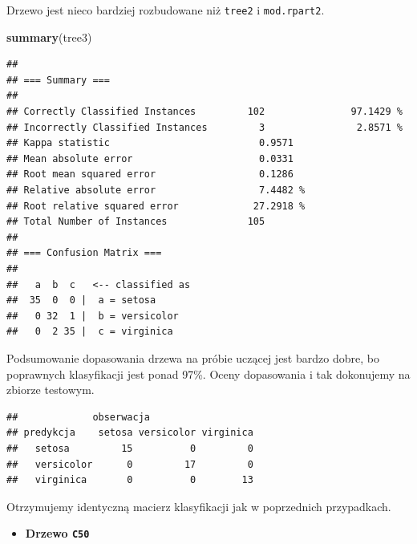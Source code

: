 \documentclass[
]{book}
\newenvironment{Shaded}{\begin{snugshade}}{\end{snugshade}}
\newcommand{\AttributeTok}[1]{\textcolor[rgb]{0.13,0.29,0.53}{#1}}
\newcommand{\FunctionTok}[1]{\textcolor[rgb]{0.13,0.29,0.53}{\textbf{#1}}}
\newcommand{\NormalTok}[1]{#1}
\newcommand{\OtherTok}[1]{\textcolor[rgb]{0.56,0.35,0.01}{#1}}
\newcommand{\SpecialCharTok}[1]{\textcolor[rgb]{0.81,0.36,0.00}{\textbf{#1}}}
\providecommand{\tightlist}{%
  \setlength{\itemsep}{0pt}\setlength{\parskip}{0pt}}
\theoremstyle{plain}
\theoremstyle{definition}
\theoremstyle{definition}
\theoremstyle{definition}
\theoremstyle{definition}
\theoremstyle{definition}
\theoremstyle{remark}
\begin{document}
Drzewo jest nieco bardziej rozbudowane niż \texttt{tree2} i \texttt{mod.rpart2}.

\begin{Shaded}
\begin{Highlighting}[]
\FunctionTok{summary}\NormalTok{(tree3)}
\end{Highlighting}
\end{Shaded}

\begin{verbatim}
## 
## === Summary ===
## 
## Correctly Classified Instances         102               97.1429 %
## Incorrectly Classified Instances         3                2.8571 %
## Kappa statistic                          0.9571
## Mean absolute error                      0.0331
## Root mean squared error                  0.1286
## Relative absolute error                  7.4482 %
## Root relative squared error             27.2918 %
## Total Number of Instances              105     
## 
## === Confusion Matrix ===
## 
##   a  b  c   <-- classified as
##  35  0  0 |  a = setosa
##   0 32  1 |  b = versicolor
##   0  2 35 |  c = virginica
\end{verbatim}

Podsumowanie dopasowania drzewa na próbie uczącej jest bardzo dobre, bo poprawnych klasyfikacji jest ponad 97\%. Oceny dopasowania i tak dokonujemy na zbiorze testowym.

\begin{Shaded}
\end{Shaded}

\begin{verbatim}
##             obserwacja
## predykcja    setosa versicolor virginica
##   setosa         15          0         0
##   versicolor      0         17         0
##   virginica       0          0        13
\end{verbatim}

Otrzymujemy identyczną macierz klasyfikacji jak w poprzednich przypadkach.

\begin{itemize}
\tightlist
\item
  \textbf{Drzewo \texttt{C50}}
\end{itemize}
\end{document}
